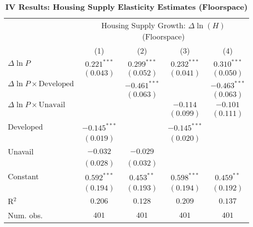 
\begin{table}[H]
\caption{\textbf{IV Results: Housing Supply Elasticity Estimates (Floorspace)}}
\begin{center}
\begin{normalsize}
\begin{threeparttable}
\begin{tabular}{l@{} c@{} c@{} c@{} c@{}}
\toprule
 & \multicolumn{4}{c}{Housing Supply Growth: $\Delta\ln(H)$ (Floorspace)} \\
\cmidrule(lr){2-5}
 & (1) & (2) & (3) & (4) \\
\midrule
$\Delta\ln P$                         & $0.221^{***}$  & $0.299^{***}$  & $0.232^{***}$  & $0.310^{***}$  \\
                                      & $(0.043)$      & $(0.052)$      & $(0.041)$      & $(0.050)$      \\
$\Delta\ln P\times{\text{Developed}}$ &                & $-0.461^{***}$ &                & $-0.463^{***}$ \\
                                      &                & $(0.063)$      &                & $(0.063)$      \\
$\Delta\ln P\times{\text{Unavail}}$   &                &                & $-0.114$       & $-0.101$       \\
                                      &                &                & $(0.099)$      & $(0.111)$      \\
Developed                             & $-0.145^{***}$ &                & $-0.145^{***}$ &                \\
                                      & $(0.019)$      &                & $(0.020)$      &                \\
Unavail                               & $-0.032$       & $-0.029$       &                &                \\
                                      & $(0.028)$      & $(0.032)$      &                &                \\
Constant                              & $0.592^{***}$  & $0.453^{**}$   & $0.598^{***}$  & $0.459^{**}$   \\
                                      & $(0.194)$      & $(0.193)$      & $(0.194)$      & $(0.192)$      \\
\midrule
R$^2$                                 & $0.206$        & $0.128$        & $0.209$        & $0.137$        \\
Num. obs.                             & $401$          & $401$          & $401$          & $401$          \\

\end{tabular}
\end{threeparttable}
\end{normalsize}
\end{center}
\end{table}
